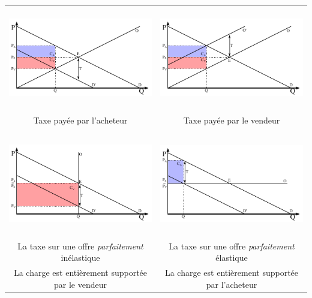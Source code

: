 \begin{center}
	\begin{tabular}{cc}
	
		\includegraphics[height=4.5cm]{images/graph_taxe_payee_par_acheteur.pdf} & \includegraphics[height=4.5cm]{images/graph_taxe_payee_par_vendeur.pdf}\\
		Taxe payée par l'acheteur                                                & Taxe payée par le vendeur\\
		
		\rule[-0.9cm]{0cm}{0.5cm}\\
		
		\includegraphics[height=4.5cm]{images/graph_taxe_offre_parfaitement_inelastique.pdf} & \includegraphics[height=4.5cm]{images/graph_taxe_offre_parfaitement_elastique.pdf}\\
		La taxe sur une offre \textit{parfaitement} inélastique                              & La taxe sur une offre \textit{parfaitement} élastique\\
		La charge est entièrement supportée par le vendeur                                   & La charge est entièrement supportée par l'acheteur\\
		

\end{tabular}
\end{center}
